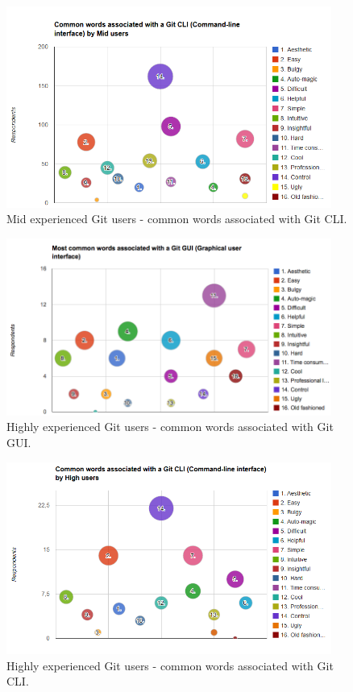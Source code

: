 \documentclass[a4paper,oneside]{bth} %
\begin{document}
		\begin{figure}[H]
			\centering
			\includegraphics[width=0.95\textwidth]{graphs/common-words-mid-users-cli.png}
			\caption{Mid experienced Git users - common words associated with Git CLI.}
			\label{fig:Mid users - common words associated with Git CLI.}
		\end{figure}
		\begin{figure}[H]
			\centering
			\includegraphics[width=0.95\textwidth]{graphs/common-words-high-users-gui.png}
			\caption{Highly experienced Git users - common words associated with Git GUI.}
			\label{fig:High users - common words associated with Git GUI.}
		\end{figure}
		\begin{figure}[H]
			\centering
			\includegraphics[width=0.95\textwidth]{graphs/common-words-high-users-cli.png}
			\caption{Highly experienced Git users - common words associated with Git CLI.}
			\label{fig:High users - common words associated with Git CLI.}
		\end{figure}	
		
\end{document}
